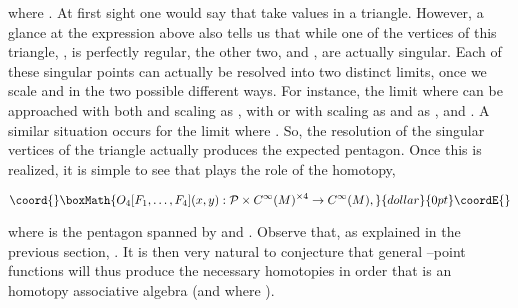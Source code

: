 \documentclass[a4paper,11pt]{article}
\begin{document}
\noindent
where \coordHE{}. At first sight one would say that \coordHE{} take 
values in a triangle. However, a glance at the expression above also 
tells us that while one of the vertices of this triangle, 
\coordHE{}, is perfectly regular, the other two, 
\coordHE{} and \coordHE{}, are actually singular. Each 
of these singular points can actually be resolved into two distinct 
limits, once we scale \coordHE{} and \coordHE{} in the two possible different ways. 
For instance, the limit where \coordHE{} can be approached 
with both \coordHE{} and \coordHE{} scaling as \coordHE{}, with \coordHE{} or with \coordHE{} scaling as \coordHE{} and \coordHE{} as \myHighlight{$\epsilon$}\coordHE{}, 
and \coordHE{}. A similar situation occurs for the limit 
where \coordHE{}. So, the resolution of the singular vertices 
of the triangle actually produces the expected pentagon. Once this is 
realized, it is simple to see that \coordHE{} plays the role of the \coordHE{} 
homotopy,

$$\coord{}\boxMath{
O_{4}[F_{1}, \ldots, F_{4}](x,y) : {\cal P} \times 
C^{\infty}(M)^{\times 4} \to C^{\infty}(M),
}{dollar}{0pt}\coordE{}$$

\noindent
where \coordHE{} is the pentagon spanned by \coordHE{} and \coordHE{}. Observe that, 
as explained in the previous section, \coordHE{}. It is then very 
natural to conjecture that general \coordHE{}--point functions will thus 
produce the necessary homotopies in order that \coordHE{} is an 
\coordHE{} homotopy associative algebra (and where \coordHE{}).
\end{document}
